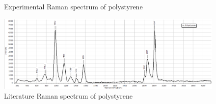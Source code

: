     \begin{figure}[h]
        \centering
        \caption{Experimental Raman spectrum of polystyrene}
        \label{fig:ps_x}
    \end{figure}

    \begin{figure}[h]
        \centering
        \includegraphics[width=\textwidth]{images/lit_raman/PS.png}
        \caption{Literature Raman spectrum of polystyrene \cite{spectrap}}
    \end{figure}
